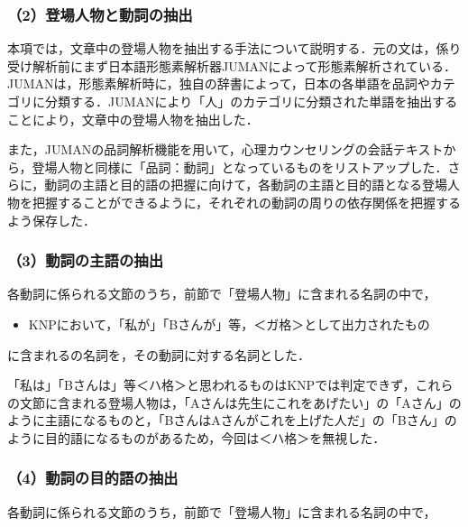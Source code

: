 \documentclass[shuuron]{kuee}
\begin{document}
\subsubsection{（2）登場人物と動詞の抽出}


本項では，文章中の登場人物を抽出する手法について説明する．元の文は，係り受け解析前にまず日本語形態素解析器JUMAN\cite{juman}によって形態素解析されている． JUMANは，形態素解析時に，独自の辞書によって，日本の各単語を品詞やカテゴリに分類する．JUMANにより「人」のカテゴリに分類された単語を抽出することにより，文章中の登場人物を抽出した．%

また，JUMANの品詞解析機能を用いて，心理カウンセリングの会話テキストから，登場人物と同様に「品詞：動詞」となっているものをリストアップした．さらに，動詞の主語と目的語の把握に向けて，各動詞の主語と目的語となる登場人物を把握することができるように，それぞれの動詞の周りの依存関係を把握するよう保存した．



\subsubsection{（3）動詞の主語の抽出}


各動詞に係られる文節のうち，前節で「登場人物」に含まれる名詞の中で，
\begin{itemize}
  \item KNPにおいて，「私が」「Bさんが」等，＜ガ格＞として出力されたもの
\end{itemize}
に含まれるの名詞を，その動詞に対する名詞とした．

「私は」「Bさんは」等＜ハ格＞と思われるものはKNPでは判定できず，これらの文節に含まれる登場人物は，「Aさんは先生にこれをあげたい」の「Aさん」のように主語になるものと，「BさんはAさんがこれを上げた人だ」の「Bさん」のように目的語になるものがあるため，今回は＜ハ格＞を無視した．

\subsubsection{（4）動詞の目的語の抽出}


各動詞に係られる文節のうち，前節で「登場人物」に含まれる名詞の中で，
\end{document}
